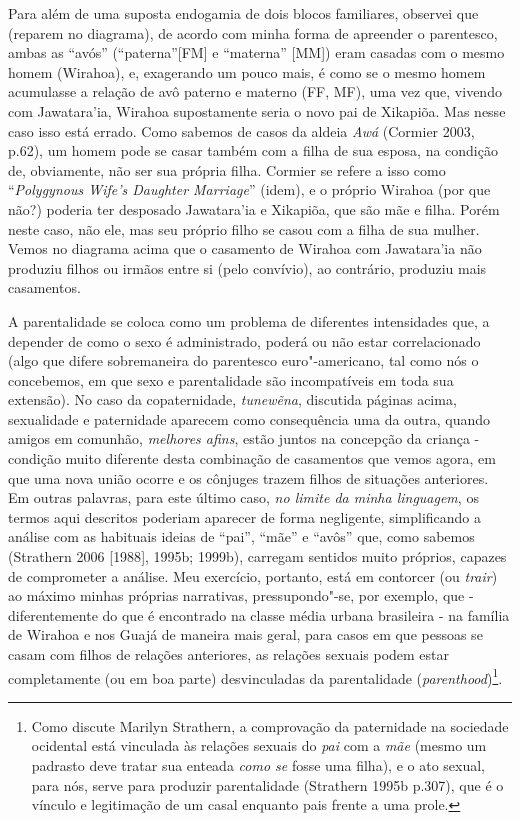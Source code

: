 Para além de uma suposta endogamia de dois blocos familiares, observei
que (reparem no diagrama), de acordo com minha forma de apreender o
parentesco, ambas as ``avós'' (``paterna''{[}FM{]} e ``materna''
{[}MM{]}) eram casadas com o mesmo homem (Wirahoa), e, exagerando um
pouco mais, é como se o mesmo homem acumulasse a relação de avô paterno
e materno (FF, MF), uma vez que, vivendo com Jawatara'ia, Wirahoa
supostamente seria o novo pai de Xikapiõa. Mas nesse caso isso está
errado. Como sabemos de casos da aldeia \emph{Awá} (Cormier 2003, p.62),
um homem pode se casar também com a filha de sua esposa, na condição de,
obviamente, não ser sua própria filha. Cormier se refere a isso como
``\emph{Polygynous Wife's Daughter Marriage}'' (idem), e o próprio
Wirahoa (por que não?) poderia ter desposado Jawatara'ia e Xikapiõa, que
são mãe e filha. Porém neste caso, não ele, mas seu próprio filho se
casou com a filha de sua mulher. Vemos no diagrama acima que o casamento
de Wirahoa com Jawatara'ia não produziu filhos ou irmãos entre si (pelo
convívio), ao contrário, produziu mais casamentos.

A parentalidade se coloca como um problema de diferentes intensidades
que, a depender de como o sexo é administrado, poderá ou não estar
correlacionado (algo que difere sobremaneira do parentesco
euro"-americano, tal como nós o concebemos, em que sexo e parentalidade
são incompatíveis em toda sua extensão). No caso da copaternidade,
\emph{tunewẽna}, discutida páginas acima, sexualidade e paternidade
aparecem como consequência uma da outra, quando amigos em comunhão,
\emph{melhores afins}, estão juntos na concepção da criança - condição
muito diferente desta combinação de casamentos que vemos agora, em que
uma nova união ocorre e os cônjuges trazem filhos de situações
anteriores. Em outras palavras, para este último caso, \emph{no limite
da minha linguagem}, os termos aqui descritos poderiam aparecer de forma
negligente, simplificando a análise com as habituais ideias de ``pai'',
``mãe'' e ``avôs'' que, como sabemos (Strathern 2006 {[}1988{]}, 1995b;
1999b), carregam sentidos muito próprios, capazes de comprometer a
análise. Meu exercício, portanto, está em contorcer (ou \emph{trair}) ao
máximo minhas próprias narrativas, pressupondo"-se, por exemplo, que -
diferentemente do que é encontrado na classe média urbana brasileira -
na família de Wirahoa e nos Guajá de maneira mais geral, para casos em
que pessoas se casam com filhos de relações anteriores, as relações
sexuais podem estar completamente (ou em boa parte) desvinculadas da
parentalidade (\emph{parenthood})\footnote{Como discute Marilyn
  Strathern, a comprovação da paternidade na sociedade ocidental está
  vinculada às relações sexuais do \emph{pai} com a \emph{mãe} (mesmo um
  padrasto deve tratar sua enteada \emph{como se} fosse uma filha), e o
  ato sexual, para nós, serve para produzir parentalidade (Strathern
  1995b p.307), que é o vínculo e legitimação de um casal enquanto pais
  frente a uma prole.}.

